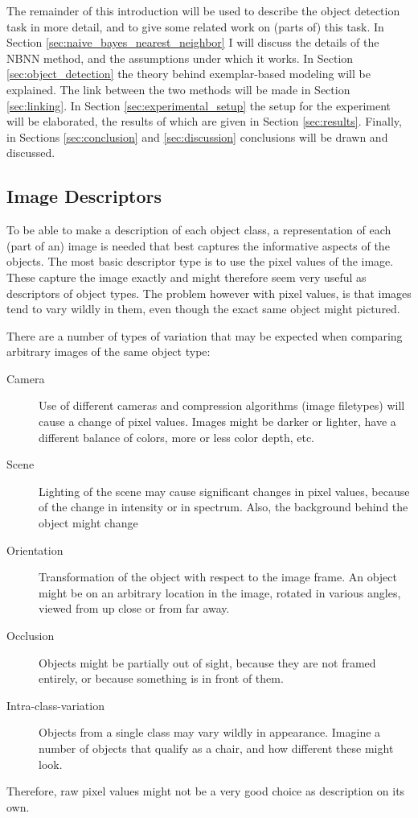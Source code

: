 \documentclass[a4paper,10pt]{article}
\begin{document}
The remainder of this introduction will be used to describe the object detection task in more detail, and to give some related work on (parts of) this task. In Section \ref{sec:naive_bayes_nearest_neighbor} I will discuss the details of the NBNN method, and the assumptions under which it works. In Section \ref{sec:object_detection} the theory behind exemplar-based modeling will be explained. The link between the two methods will be made in Section \ref{sec:linking}. In Section \ref{sec:experimental_setup} the setup for the experiment will be elaborated, the results of which are given in Section \ref{sec:results}. Finally, in Sections \ref{sec:conclusion} and \ref{sec:discussion} conclusions will be drawn and discussed.

\subsection{Image Descriptors} %
\label{sub:image_descriptors}
To be able to make a description of each object class, a representation of each (part of an) image is needed that best captures the informative aspects of the objects. The most basic descriptor type is to use the pixel values of the image. These capture the image exactly and might therefore seem very useful as descriptors of object types. The problem however with pixel values, is that images tend to vary wildly in them, even though the exact same object might pictured.

There are a number of types of variation that may be expected when comparing arbitrary images of the same object type:
\begin{description}
    \item[Camera] Use of different cameras and compression algorithms (image filetypes) will cause a change of pixel values. Images might be darker or lighter, have a different balance of colors, more or less color depth, etc.
    \item[Scene] Lighting of the scene may cause significant changes in pixel values, because of the change in intensity or in spectrum. Also, the background behind the object might change
    \item[Orientation] Transformation of the object with respect to the image frame. An object might be on an arbitrary location in the image, rotated in various angles, viewed from up close or from far away.
    \item[Occlusion] Objects might be partially out of sight, because they are not framed entirely, or because something is in front of them.
    \item[Intra-class-variation] Objects from a single class may vary wildly in appearance. Imagine a number of objects that qualify as a chair, and how different these might look.
\end{description}
Therefore, raw pixel values might not be a very good choice as description on its own.
\end{document}
